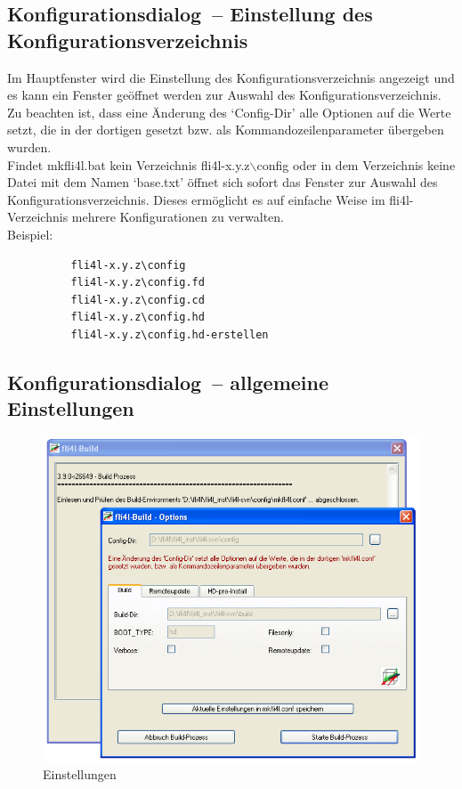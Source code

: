   \subsection{Konfigurationsdialog~-- Einstellung des Konfigurationsverzeichnis}

  Im Hauptfenster wird die Einstellung des Konfigurationsverzeichnis angezeigt
  und es kann ein Fenster geöffnet werden zur Auswahl des
  Konfigurationsverzeichnis.\\

  Zu beachten ist, dass eine Änderung des `Config-Dir' alle Optionen auf
  die Werte setzt, die in der dortigen
   gesetzt bzw.
  als Kommandozeilenparameter übergeben wurden.\\

  Findet mkfli4l.bat kein Verzeichnis fli4l-x.y.z$\backslash$config oder in
  dem Verzeichnis keine Datei mit dem Namen `base.txt' öffnet sich sofort das
  Fenster zur Auswahl des Konfigurationsverzeichnis. Dieses ermöglicht es auf
  einfache Weise im fli4l-Verzeichnis mehrere Konfigurationen zu verwalten.\\

  Beispiel:

\begin{example}
\begin{verbatim}
          fli4l-x.y.z\config
          fli4l-x.y.z\config.fd
          fli4l-x.y.z\config.cd
          fli4l-x.y.z\config.hd
          fli4l-x.y.z\config.hd-erstellen
\end{verbatim}
\end{example}

  \subsection{Konfigurationsdialog~-- allgemeine Einstellungen}
  \begin{figure}[ht!]
  \centering
  \includegraphics[width=\columnwidth]{win_build_build}
  \caption{Einstellungen}
  \label{fig:win_build_build}
  \end{figure}

